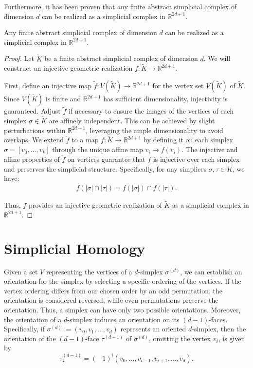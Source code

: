 Furthermore, it has been proven that any finite abstract simplicial complex of dimension
$d$ can be realized as a simplicial complex in $\mathbb{R}^{2d+1}$.

\begin{theorem}
	Any finite abstract simplicial complex of dimension $d$ can be realized as a simplicial
	complex in $\mathbb{R}^{2d+1}$.
\end{theorem}

\begin{proof}
	Let $\tilde{K}$ be a finite abstract simplicial complex of dimension $d$. We
	will construct an injective geometric realization
	$f: \tilde{K}\to \mathbb{R}^{2d+1}$.

	First, define an injective map $\tilde{f}: V(\tilde{K}) \to \mathbb{R}^{2d+1}$
	for the vertex set $V(\tilde{K})$ of $\tilde{K}$. Since $V(\tilde{K})$ is
	finite and $\mathbb{R}^{2d+1}$ has sufficient dimensionality, injectivity is guaranteed.
	Adjust $\tilde{f}$ if necessary to ensure the images of the vertices of each
	simplex $\sigma \in \tilde{K}$ are affinely independent. This can be achieved by
	slight perturbations within $\mathbb{R}^{2d+1}$, leveraging the ample
	dimensionality to avoid overlaps. We extend $\tilde{f}$ to a map $f: \tilde{K}\to \mathbb{R}^{2d+1}$ by defining
	it on each simplex $\sigma = [v_{0}, \ldots, v_{k}]$ through the unique affine
	map $v_{i} \mapsto \tilde{f}(v_{i})$. The injective and affine properties of $\tilde
	{f}$ on vertices guarantee that $f$ is injective over each simplex and preserves
	the simplicial structure. Specifically, for any simplices $\sigma, \tau \in \tilde
	{K}$, we have:
	\begin{align}
		f(|\sigma| \cap |\tau|) = f(|\sigma|) \cap f(|\tau|).
	\end{align}

	Thus, $f$ provides an injective geometric realization of $\tilde{K}$ as a simplicial
	complex in $\mathbb{R}^{2d+1}$.
\end{proof}

\section{Simplicial Homology}
\label{Simplicial Homology}
Given a set \( V \) representing the vertices of a \( d \)-simplex
\( \sigma^{(d)} \), we can establish an orientation for the simplex by selecting a
specific ordering of the vertices. If the vertex ordering differs from our chosen
order by an odd permutation, the orientation is considered reversed, while even permutations
preserve the orientation. Thus, a simplex can have only two possible orientations.
Moreover, the orientation of a \( d \)-simplex induces an orientation on its \( (d-1) \)-faces.
Specifically, if \( \sigma^{(d)} := (v_{0}, v_{1}, \ldots, v_{d}) \) represents an oriented
\( d \)-simplex, then the orientation of the \( (d-1) \)-face \( \tau^{(d-1)} \) of
\( \sigma^{(d)} \), omitting the vertex \( v_{i} \), is given by
\begin{equation}
\tau_{i}^{(d-1)} = (-1)^{i} (v_{0}, \ldots, v_{i-1}, v_{i+1}, \ldots, v_{d}).
\end{equation}

